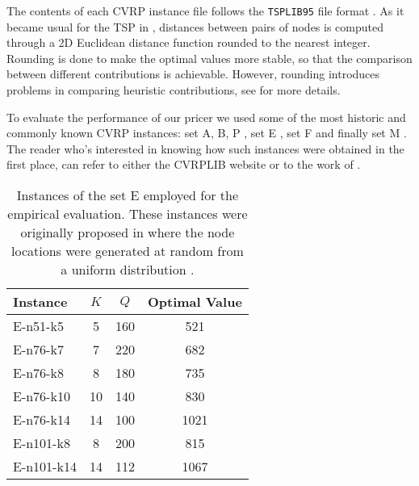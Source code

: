 The contents of each CVRP instance file follows the \texttt{TSPLIB95} file format \parencite{reinelt1995}.
As it became usual for the TSP in \textcite{reinelt1991},
distances between pairs of nodes
is computed through a 2D Euclidean distance function
rounded to the nearest integer.
Rounding is done to make the optimal values more stable, so that the comparison between different contributions is achievable.
However, rounding introduces problems in comparing heuristic contributions, see \textcite{uchoa2017} for more details.

\medskip

To evaluate the performance of our pricer we used some of the most historic
and commonly known
CVRP instances:
set A, B, P \parencite{augerat1995},
set E \parencite{dantzig1959, christofides1969, gaskell1967bases, gillett1974heuristic},
set F \parencite{fisher1994}
and finally set M \parencite{christofides1979vehicle}.
The reader who's interested in knowing how such instances were obtained in the first
place, can refer to either the CVRPLIB website or to the work of \textcite{uchoa2017}.


\begin{table*}[ht]
	\centering
	\begin{tabular}[t]{lccc}
		\toprule
		\textbf{Instance} & $K$ & $Q$ & \textbf{Optimal Value} \\
		\midrule
		E-n51-k5          & 5   & 160 & 521                    \\
		E-n76-k7          & 7   & 220 & 682                    \\
		E-n76-k8          & 8   & 180 & 735                    \\
		E-n76-k10         & 10  & 140 & 830                    \\
		E-n76-k14         & 14  & 100 & 1021                   \\
		E-n101-k8         & 8   & 200 & 815                    \\
		E-n101-k14        & 14  & 112 & 1067                   \\
		\bottomrule
	\end{tabular}
	\label{tbl:cvrp-instance-family-E}
	\caption{Instances of the set E employed for the empirical evaluation.
		These instances were originally proposed in \textcite{dantzig1959, christofides1969, gaskell1967bases, gillett1974heuristic}
		where the node locations were generated at random from a uniform distribution \parencite{uchoa2017}.
	}
\end{table*}

